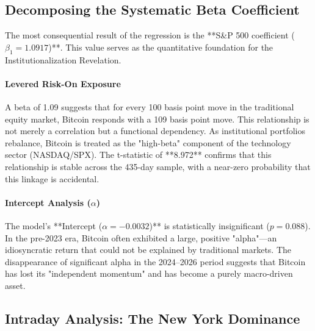 \documentclass[10pt, conference, compsocconf]{IEEEtran}
\begin{document}

\subsection{Decomposing the Systematic Beta Coefficient}

The most consequential result of the regression is the **S\&P 500 coefficient ($\beta_1 = 1.0917$)**. This value serves as the quantitative foundation for the Institutionalization Revelation.

\paragraph{Levered Risk-On Exposure}
A beta of 1.09 suggests that for every 100 basis point move in the traditional equity market, Bitcoin responds with a 109 basis point move. This relationship is not merely a correlation but a functional dependency. As institutional portfolios rebalance, Bitcoin is treated as the "high-beta" component of the technology sector (NASDAQ/SPX). The t-statistic of **8.972** confirms that this relationship is stable across the 435-day sample, with a near-zero probability that this linkage is accidental.

\paragraph{Intercept Analysis ($\alpha$)}
The model’s **Intercept ($\alpha = -0.0032$)** is statistically insignificant ($p = 0.088$). In the pre-2023 era, Bitcoin often exhibited a large, positive "alpha"—an idiosyncratic return that could not be explained by traditional markets. The disappearance of significant alpha in the 2024--2026 period suggests that Bitcoin has lost its "independent momentum" and has become a purely macro-driven asset.


\subsection{Intraday Analysis: The New York Dominance}
\end{document}

